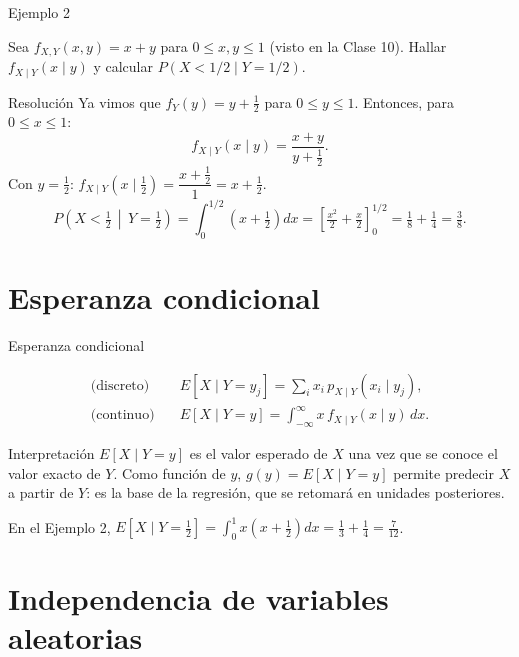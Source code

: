 \documentclass[aspectratio=169,11pt]{beamer}
\begin{document}
\begin{frame}{Ejemplo 2}
\begin{example}
Sea $f_{X,Y}(x,y) = x+y$ para $0\le x,y\le 1$ (visto en la Clase 10). Hallar $f_{X\mid Y}(x\mid y)$ y calcular $P(X < 1/2 \mid Y = 1/2)$.
\end{example}
\pause
\begin{block}{Resolución}
Ya vimos que $f_Y(y) = y + \tfrac12$ para $0\le y\le 1$. Entonces, para $0\le x\le 1$:
\[
f_{X\mid Y}(x\mid y) = \frac{x+y}{y+\tfrac12}.
\]
Con $y=\tfrac12$: $f_{X\mid Y}(x\mid \tfrac12) = \dfrac{x+\tfrac12}{1} = x+\tfrac12$.
\[
P\left(X<\tfrac12 \,\middle|\, Y=\tfrac12\right) = \int_0^{1/2} \left(x+\tfrac12\right) dx = \left[\tfrac{x^2}{2}+\tfrac{x}{2}\right]_0^{1/2} = \tfrac18+\tfrac14 = \tfrac38.
\]
\end{block}
\end{frame}

\section{Esperanza condicional}

\begin{frame}{Esperanza condicional}
\begin{definition}
\begin{align*}
\text{(discreto)} \quad & E[X\mid Y=y_j] = \sum_i x_i \, p_{X\mid Y}(x_i \mid y_j), \\
\text{(continuo)} \quad & E[X\mid Y=y] = \int_{-\infty}^{\infty} x \, f_{X\mid Y}(x\mid y)\, dx.
\end{align*}
\end{definition}
\pause
\begin{block}{Interpretación}
$E[X\mid Y=y]$ es el valor esperado de $X$ una vez que se conoce el valor exacto de $Y$. Como función de $y$, $g(y) = E[X\mid Y=y]$ permite predecir $X$ a partir de $Y$: es la base de la regresión, que se retomará en unidades posteriores.
\end{block}
\begin{example}
En el Ejemplo 2, $E[X\mid Y=\tfrac12] = \int_0^1 x\left(x+\tfrac12\right) dx = \tfrac13+\tfrac14 = \tfrac{7}{12}$.
\end{example}
\end{frame}

\section{Independencia de variables aleatorias}
\end{document}
